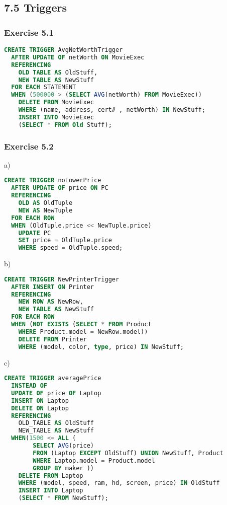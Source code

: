 \documentclass[../../main.tex]{subfiles}
\begin{document}
\subsection{7.5 Triggers}

\subsubsection*{Exercise 5.1}

\begin{lstlisting}[language=sql]
  CREATE TRIGGER AvgNetWorthTrigger
  AFTER UPDATE OF netWorth ON MovieExec
  REFERENCING
    OLD TABLE AS OldStuff,
    NEW TABLE AS NewStuff
  FOR EACH STATEMENT
  WHEN (500000 > (SELECT AVG(netWorth) FROM MovieExec))
    DELETE FROM MovieExec
    WHERE (name, address, cert# , netWorth) IN NewStuff;
    INSERT INTO MovieExec
    (SELECT * FROM Old Stuff);
\end{lstlisting}

\subsubsection*{Exercise 5.2}

a)

\begin{lstlisting}[language=sql]
  CREATE TRIGGER noLowerPrice
  AFTER UPDATE OF price ON PC
  REFERENCING
    OLD AS OldTuple
    NEW AS NewTuple
  FOR EACH ROW
  WHEN (OldTuple.price << NewTuple.price)
    UPDATE PC
    SET price = OldTuple.price
    WHERE speed = OldTuple.speed;
\end{lstlisting}

b)

\begin{lstlisting}[language=sql]
  CREATE TRIGGER NewPrinterTrigger
  AFTER INSERT ON Printer
  REFERENCING
    NEW ROW AS NewRow,
    NEW TABLE AS NewStuff
  FOR EACH ROW
  WHEN (NOT EXISTS (SELECT * FROM Product
    WHERE Product.model = NewRow.model))
    DELETE FROM Printer
    WHERE (model, color, type, price) IN NewStuff;
\end{lstlisting}

c)

\begin{lstlisting}[language=sql]
  CREATE TRIGGER averagePrice
  INSTEAD OF
  UPDATE OF price OF Laptop
  INSERT ON Laptop
  DELETE ON Laptop
  REFERENCING
    OLD_TABLE AS OldStuff
    NEW_TABLE AS NewStuff
  WHEN(1500 <= ALL (
        SELECT AVG(price)
        FROM (Laptop EXCEPT OldStuff) UNION NewStuff, Product
        WHERE Laptop.model = Product.model
        GROUP BY maker ))
    DELETE FROM Laptop
    WHERE (model, speed, ram, hd, screen, price) IN OldStuff
    INSERT INTO Laptop
    (SELECT * FROM NewStuff);
\end{lstlisting}
\end{document}
